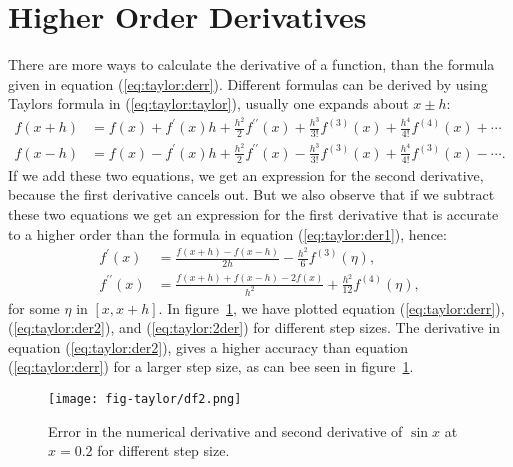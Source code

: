 \documentclass[graybox,sectrefs,envcountresetchap,open=right,final]{svmonodo}
\begin{document}
\section{Higher Order Derivatives}
There are more ways to calculate the derivative of a function, than the formula given in equation (\ref{eq:taylor:derr}). Different formulas can be
derived by using Taylors formula in (\ref{eq:taylor:taylor}), usually one expands about $x\pm h$:
\begin{align}
f(x+h)&=f(x)+f^\prime(x)h + \frac{h^2}{2}f^{\prime\prime}(x)+ \frac{h^3}{3!}f^{(3)}(x)+ \frac{h^4}{4!}f^{(4)}(x)+\cdots\nonumber\\ 
f(x-h)&=f(x)-f^\prime(x)h + \frac{h^2}{2}f^{\prime\prime}(x)- \frac{h^3}{3!}f^{(3)}(x)+ \frac{h^4}{4!}f^{(3)}(x)-\cdots.
\end{align}
If we add these two equations, we get an expression for the second derivative, because the first derivative cancels out. But we also observe that if we subtract these two equations we get 
an expression for the first derivative that is accurate to a higher order than the formula in equation (\ref{eq:taylor:der1}), hence:
\begin{align}
f^\prime(x)&=\frac{f(x+h)-f(x-h)}{2h} -\frac{h^2}{6}f^{(3)}(\eta),\label{eq:taylor:der2}\\ 
f^{\prime\prime}(x) &= \frac{f(x+h)+f(x-h)-2f(x)}{h^2}+ \frac{h^2}{12}f^{(4)}(\eta)\label{eq:taylor:2der},
\end{align}
for some $\eta$ in $[x,x+h]$. In figure~\ref{fig:taylor:df2}, we have plotted equation (\ref{eq:taylor:derr}), (\ref{eq:taylor:der2}), and (\ref{eq:taylor:2der}) for 
different step sizes. The derivative in equation (\ref{eq:taylor:der2}), gives a higher accuracy than equation (\ref{eq:taylor:derr}) for a larger step size,
as can bee seen in figure~\ref{fig:taylor:df2}.


\begin{figure}[!ht]  %
  \centerline{\texttt{[image: fig-taylor/df2.png]}}
  \caption{
  Error in the numerical derivative and second derivative of $\sin x$ at $x=0.2$ for different step size. \label{fig:taylor:df2}
  }
\end{figure}
\end{document}
